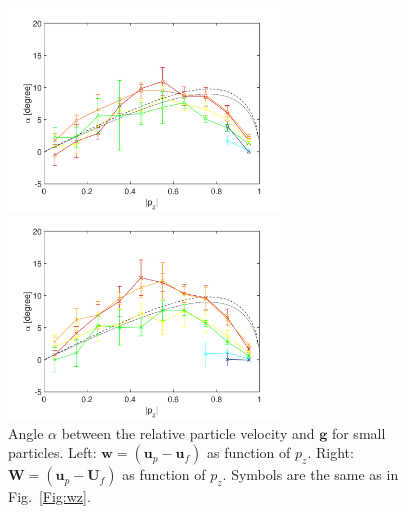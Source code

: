 \documentclass[]{jfm}
\begin{document}
\begin{figure}
\centering
\begin{minipage}{.5\textwidth}
  \centering
  \includegraphics[width=2.9in]{figures/alpha-local-small.pdf}
\end{minipage}%
\begin{minipage}{.5\textwidth}
  \centering
  \includegraphics[width=2.9in]{figures/alpha-U-small.pdf}
\end{minipage}
\caption{Angle $\alpha$ between the relative particle velocity and $\mathbf{g}$ for small particles. Left: $\mathbf{w}=(\mathbf{u}_p-\mathbf{u}_f)$ as function of $p_z$. Right: $\mathbf{W}=(\mathbf{u}_p-\mathbf{U}_f)$ as function of $p_z$. Symbols are the same as in Fig.~\ref{Fig:wz}.}
\label{Fig:alpha}
\end{figure}
\end{document}
